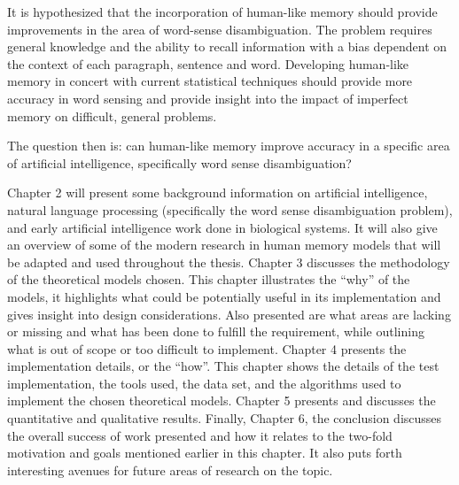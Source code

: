 It is hypothesized that the incorporation of human-like memory should provide
improvements in the area of word-sense disambiguation. The problem requires
general knowledge and the ability to recall information with a bias dependent on
the context of each paragraph, sentence and word.  Developing human-like memory
in concert with current statistical techniques should provide more accuracy in
word sensing and provide insight into the impact of imperfect memory on
difficult, general problems.

The question then is: can human-like memory improve accuracy in a specific area
of artificial intelligence, specifically word sense disambiguation?

Chapter 2 will present some background information on artificial intelligence,
natural language processing (specifically the word sense disambiguation
problem), and early artificial intelligence work done in biological systems. It
will also give an overview of some of the modern research in human memory models
that will be adapted and used throughout the thesis.  Chapter 3 discusses the
methodology of the theoretical models chosen. This chapter illustrates the
``why'' of the models, it highlights what could be potentially useful in its
implementation and gives insight into design considerations.  Also presented are
what areas are lacking or missing and what has been done to fulfill the
requirement, while outlining what is out of scope or too difficult to implement.
Chapter 4 presents the implementation details, or the ``how''.  This chapter
shows the details of the test implementation, the tools used, the data set, and
the algorithms used to implement the chosen theoretical models.  Chapter 5
presents and discusses the quantitative and qualitative results. Finally,
Chapter 6, the conclusion discusses the overall success of work presented and
how it relates to the two-fold motivation and goals mentioned earlier in this
chapter. It also puts forth interesting avenues for future areas of research on
the topic.
